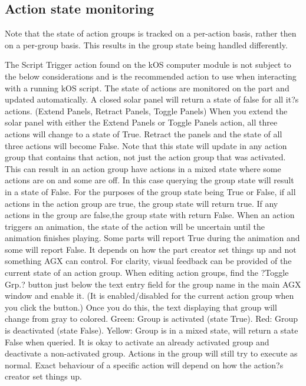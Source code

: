 \subsection{Action state monitoring}

Note that the state of action groups is tracked on a per-action basis, rather then on a per-group basis. This results in the group state being handled differently.

The Script Trigger action found on the kOS computer module is not subject to the below considerations and is the recommended action to use when interacting with a running kOS script.
The state of actions are monitored on the part and updated automatically. A closed solar panel will return a state of false for all it?s actions. (Extend Panels, Retract Panels, Toggle Panels) When you extend the solar panel with either the Extend Panels or Toggle Panels action, all three actions will change to a state of True. Retract the panels and the state of all three actions will become False. Note that this state will update in any action group that contains that action, not just the action group that was activated.
This can result in an action group have actions in a mixed state where some actions are on and some are off. In this case querying the group state will result in a state of False. For the purposes of the group state being True or False, if all actions in the action group are true, the group state will return true. If any actions in the group are false,the group state with return False.
When an action triggers an animation, the state of the action will be uncertain until the animation finishes playing. Some parts will report True during the animation and some will report False. It depends on how the part creator set things up and not something AGX can control.
For clarity, visual feedback can be provided of the current state of an action group. When editing action groups, find the ?Toggle Grp.? button just below the text entry field for the group name in the main AGX window and enable it. (It is enabled/disabled for the current action group when you click the button.) Once you do this, the text displaying that group will change from gray to colored. Green: Group is activated (state True). Red: Group is deactivated (state False). Yellow: Group is in a mixed state, will return a state False when queried.
It is okay to activate an already activated group and deactivate a non-activated group. Actions in the group will still try to execute as normal. Exact behaviour of a specific action will depend on how the action?s creator set things up.

